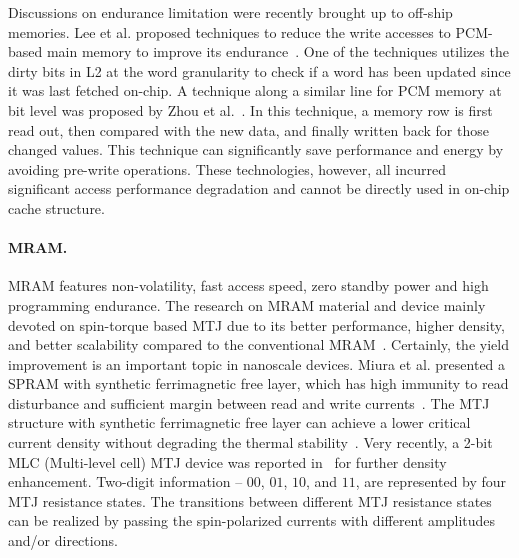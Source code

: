 
Discussions on endurance limitation were recently brought up to off-ship memories. Lee et al. proposed techniques to reduce the write accesses to PCM-based main memory to improve its endurance~\cite{ISCA09+MSPRAM}. One of the techniques utilizes the dirty bits in L2 at the word granularity to check if a word has been updated since it was last fetched on-chip. A technique along a similar line for PCM memory at bit level was proposed by Zhou et al.~\cite{ISCA09+Yang}. In this technique, a memory row is first read out, then compared with the new data, and finally written back for those changed values. This technique can significantly save performance and energy by avoiding pre-write operations. These technologies, however, all incurred significant access performance degradation and cannot be directly used in on-chip cache structure.


\paragraph{MRAM.}
MRAM features non-volatility, fast access speed, zero standby power and high programming endurance\cite{Hosomi05,Diao07}. The research on MRAM material and device mainly devoted on spin-torque based MTJ due to its better performance, higher density, and better scalability compared to the conventional MRAM~\cite{Kawahara07,Salahuddin07,Beach08,Kishi08}. Certainly, the yield improvement is an important topic in nanoscale devices. Miura et al. presented a SPRAM with synthetic ferrimagnetic free layer, which has high immunity to read disturbance and sufficient margin between read and write currents~\cite{Miura07}. The MTJ structure with synthetic ferrimagnetic free layer can achieve a lower critical current density without degrading the thermal stability~\cite{Durlam03}.
Very recently, a 2-bit MLC (Multi-level cell) MTJ device was reported in~\cite{Lou08} for further density enhancement. Two-digit information -- $00$, $01$, $10$, and $11$, are represented by four MTJ resistance states. The transitions between different MTJ resistance states can be realized by passing the spin-polarized currents with different amplitudes and/or directions.


